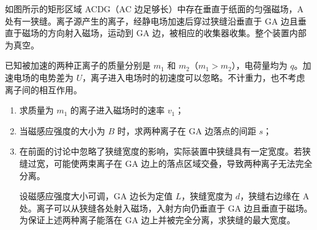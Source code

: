 \documentclass[\gkver]{gaokaozhenti}
\begin{document}
\begin{enumerate}
如图所示的矩形区域 ACDG（AC 边足够长）中存在垂直于纸面的匀强磁场，A 处有一狭缝。离子源产生的离子，经静电场加速后穿过狭缝沿垂直于 GA 边且垂直于磁场的方向射入磁场，运动到 GA 边，被相应的收集器收集。整个装置内部为真空。

已知被加速的两种正离子的质量分别是 $m_{1}$ 和 $m_{2}$（$m_{1}>m_{2}$），电荷量均为 $q$。加速电场的电势差为 $U$，离子进入电场时的初速度可以忽略。不计重力，也不考虑离子间的相互作用。

\begin{enumerate}
	\item
	求质量为 $m_{1}$ 的离子进入磁场时的速率 $v_{1}$；
	\item
	当磁感应强度的大小为 $B$ 时，求两种离子在 GA 边落点的间距 $s$；
	\item
	在前面的讨论中忽略了狭缝宽度的影响，实际装置中狭缝具有一定宽度。若狭缝过宽，可能使两束离子在 GA 边上的落点区域交叠，导致两种离子无法完全分离。

	设磁感应强度大小可调，GA 边长为定值 $L$，狭缝宽度为 $d$，狭缝右边缘在 A 处。离子可以从狭缝各处射入磁场，入射方向仍垂直于 GA 边且垂直于磁场。为保证上述两种离子能落在 GA 边上并被完全分离，求狭缝的最大宽度。
\end{enumerate}


\end{enumerate}
\end{document}
